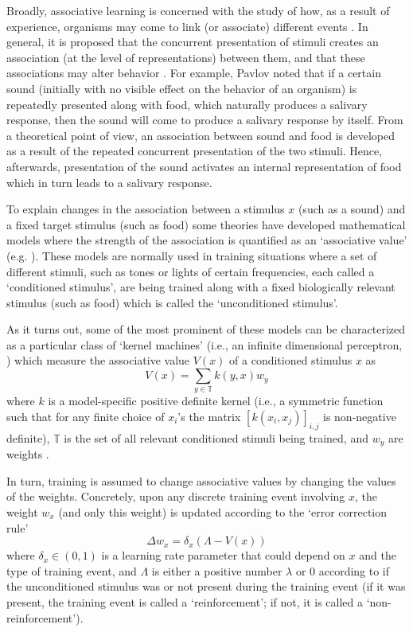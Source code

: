\documentclass[]{interact}
\theoremstyle{plain}%
\theoremstyle{definition}
\theoremstyle{remark}
\newcommand{\quot}[1]{`#1'}
\begin{document}
Broadly, associative learning is concerned with the study of how, as a result of experience, organisms may come to link (or associate) different events \cite{WM97}. In general, it is proposed that the concurrent presentation of stimuli creates an association (at the level of representations) between them, and that these associations may alter behavior \cite{RW72,W03}.
For example, Pavlov \cite{Pavlov1927} noted that if a certain sound (initially with no visible effect on the behavior of an organism) is repeatedly presented along with food, which naturally produces a salivary response, then the sound will come to produce a salivary response by itself. 
From a theoretical point of view, an association between sound and food is developed as a result of the repeated concurrent presentation of the two stimuli. Hence, afterwards, presentation of the sound activates an internal representation of food which in turn leads to a salivary response.

To explain changes in the association between a stimulus $x$ (such as a sound) and a fixed target stimulus (such as food) some theories have developed mathematical models where the strength of the association is quantified as an \quot{associative value} (e.g. \cite{RW72, P94, TL20, W03, G20}). These models are normally used in training situations where a set of different stimuli, such as tones or lights of certain frequencies, each called a \quot{conditioned stimulus}, are being trained along with a fixed biologically relevant stimulus (such as food) which is called the \quot{unconditioned stimulus}. 

As it turns out, some of the most prominent of these models can be characterized as a particular class of \quot{kernel machines} \cite{G18} (i.e., an infinite dimensional perceptron, \cite{JSW07}) which measure the associative value $V(x)$ of a conditioned stimulus $x$ as 
\[
V(x)=\sum_{y\in \mathbb{T}}k(y,x)w_y
\]
where $k$ is a model-specific positive definite kernel (i.e., a symmetric function such that for any finite choice of $x_i$'s the matrix $[k(x_i,x_j)]_{i,j}$ is non-negative definite), $\mathbb{T}$ is the set of all relevant conditioned stimuli being trained, and $w_y$ are weights \cite{A25,A24,G18,G15}. 

In turn, training is assumed to change associative values by changing the values of the weights. Concretely, upon any discrete training event involving $x$, the weight $w_x$ (and only this weight) is updated according to the \quot{error correction rule}
\[
\Delta w_x=\delta_x (\Lambda-V(x))
\]
where $\delta_x\in (0,1)$ is a learning rate parameter that could depend on $x$ and the type of training event, and $\Lambda$ is either a positive number $\lambda$ or $0$ according to if the unconditioned stimulus was or not present during the training event (if it was present, the training event is called a \quot{reinforcement}; if not, it is called a \quot{non-reinforcement}). 
\end{document}
